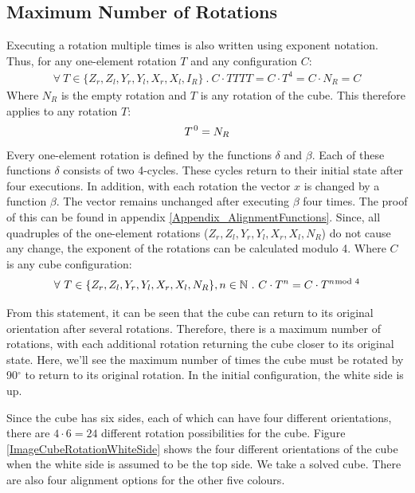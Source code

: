 \documentclass[12pt,a4paper]{article}
\theoremstyle{custom}
\begin{document}
\subsection{Maximum Number of Rotations}
\label{Section_MaxNumberRotations}

Executing a rotation multiple times is also written using exponent notation.
Thus, for any one-element rotation $T$ and any configuration $C$:
\begin{align*}
\forall \ T \in \{{Z_r}, {Z_l}, {Y_r}, {Y_l}, {X_r}, {X_l} , I_R \} \ . \ C \cdot TTTT= C \cdot T^4=C \cdot N_R = C
\end{align*}
Where $N_R$ is the empty rotation and $T$ is any rotation of the cube. This therefore applies to any rotation $T$:
\begin{align*}
T^{\hspace*{0.1em}0}=N_R
\end{align*}
Every one-element rotation is defined by the functions $\delta$ and $\beta$. Each of these functions $\delta$ consists of two 4-cycles. These cycles return to their initial state after four executions.  In addition, with each rotation the vector $x$ is changed by a function $\beta$. The vector remains unchanged after executing $\beta$ four times. 
The proof of this can be found in appendix \ref{Appendix_AlignmentFunctions}.
Since, all quadruples of the one-element rotations (${Z_r}, {Z_l}, {Y_r}, {Y_l}, {X_r}, {X_l} , N_R$) do not cause any change, the exponent of the rotations can be calculated modulo 4. Where $C$ is any cube configuration:
\begin{align*}
\forall \ T \in \{{Z_r}, {Z_l}, {Y_r}, {Y_l}, {X_r}, {X_l}, N_R \}, n \in \mathbb{N} \ . \ C \cdot T^n=C \cdot T^{n \hspace*{-0.5em} \mod 4}
\end{align*}

From this statement, it can be seen that the cube can return to its original orientation after several rotations. Therefore, there is a maximum number of rotations, with each additional rotation returning the cube closer to its original state.
Here, we'll see the maximum number of times the cube must be rotated by 90$^\circ$ to return to its original rotation. In the initial configuration, the white side is up.

Since the cube has six sides, each of which can have four different orientations, there are $4 \cdot 6 = 24$ different rotation possibilities for the cube. Figure \ref{ImageCubeRotationWhiteSide} shows the four different orientations of the cube when the white side is assumed to be the top side. We take a solved cube. There are also four alignment options for the other five colours. 
\end{document}
